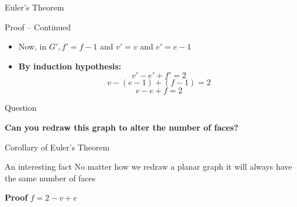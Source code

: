 \begin{section}{Euler’s Theorem}
\begin{frame}{Proof -- Continued}
\begin{itemize}
\begin{columns}
\begin{center}
    \end{center}

 $v' = $ number of vertices
            \newline $e' = $ number of edges
            \newline $f' = $ number of faces
        
\end{columns}    \pause
    
        \newline
        \item Now, in $G', f' = f-1$ and $v' = v$ and $e' = e-1$ 
        \item \textbf{By induction hypothesis:} 
        $$v'-e' + f' = 2 $$
       $$ v-(e-1)+(f-1)=2 $$
       $$ v-e+f = 2 $$
        
    \end{itemize}
        
    \end{frame}
    
    \begin{frame}{Question}
    \begin{center}
    \textbf{Can you redraw this graph to alter the number of faces?} \newline
    
    \end{center}
        
    \end{frame}
    
    \begin{frame}{Corollary of Euler's Theorem}
    \begin{block}{An interesting fact}
     No matter how we redraw a planar graph it will always have the same number of faces
    \end{block}
    
    
    \textbf{Proof}\newline
    $f=2-v+e $
    
        
    \end{frame}
\end{section}

